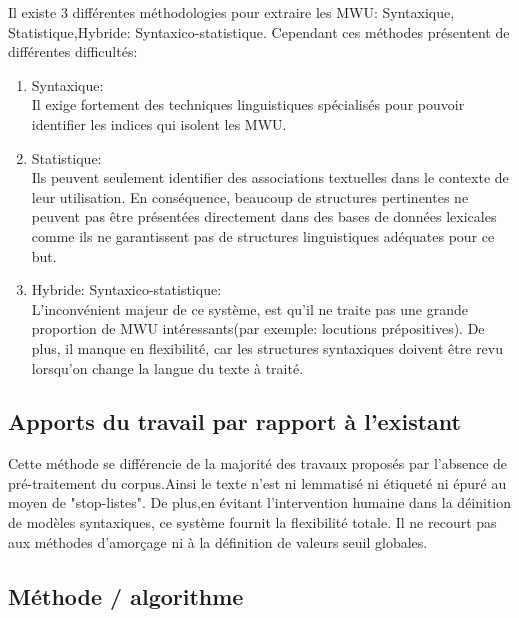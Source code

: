 \documentclass[a4paper,12pt]{article}
\begin{document}
 Il existe 3 diff\'erentes m\'ethodologies pour extraire les MWU: Syntaxique, Statistique,Hybride: Syntaxico-statistique. Cependant ces m\'ethodes pr\'esentent de diff\'erentes difficult\'es: \\
 \begin{enumerate}
 \item Syntaxique: \\
 Il exige fortement des techniques linguistiques sp\'ecialis\'es pour pouvoir identifier les indices qui isolent les MWU.
 \item Statistique:\\
Ils peuvent seulement identifier des associations textuelles dans le contexte de leur utilisation. En cons\'equence, beaucoup de structures pertinentes ne peuvent pas \^etre pr\'esent\'ees directement dans des bases de donn\'ees lexicales comme ils ne garantissent pas de structures linguistiques ad\'equates pour ce but.
 \item Hybride: Syntaxico-statistique:\\
 L'inconv\'enient majeur de ce syst\`eme, est qu'il ne traite pas une grande proportion de MWU int\'eressants(par exemple: locutions pr\'epositives). De plus, il manque en flexibilit\'e, car les structures syntaxiques doivent \^etre revu lorsqu'on change la langue du texte \`a trait\'e.
 \end{enumerate}

    \subsection{Apports du travail par rapport à l'existant}
    
    Cette m\'ethode se diff\'erencie de la majorit\'e des travaux propos\'es par l'absence de pr\'e-traitement du corpus.Ainsi le texte n'est ni lemmatis\'e ni \'etiquet\'e ni \'epur\'e au moyen de "stop-listes". De plus,en \'evitant l'intervention humaine dans la d\'einition de mod\`eles syntaxiques, ce syst\`eme fournit la flexibilit\'e totale. Il ne recourt pas aux m\'ethodes d'amor\c cage ni \`a la d\'efinition de valeurs seuil globales.
    
    \subsection{Méthode / algorithme}
    
\end{document}
